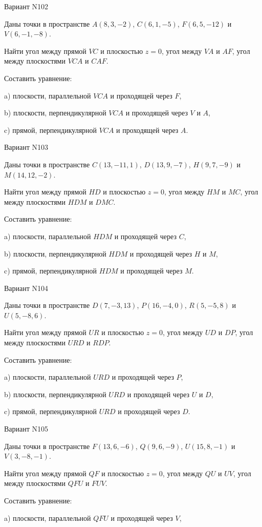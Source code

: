\documentclass[11pt]{report}
\begin{document}
Вариант N102

Даны точки в пространстве
$A(8, 3, -2)$, $C(6, 1, -5)$, $F(6, 5, -12)$ и
$V(6, -1, -8)$.

Найти угол между прямой $VC$ и плоскостью $z = 0$, угол между $VA$ и $AF$, угол между плоскостями $VCA$ 
и $CAF$.

Составить уравнение: 

a) плоскости, параллельной $VCA$ и проходящей через $F$,

b) плоскости, перпендикулярной $VCA$ и проходящей через $V$ и $A$,

c) прямой, перпендикулярной $VCA$ и проходящей через $A$.

Вариант N103

Даны точки в пространстве
$C(13, -11, 1)$, $D(13, 9, -7)$, $H(9, 7, -9)$ и
$M(14, 12, -2)$.

Найти угол между прямой $HD$ и плоскостью $z = 0$, угол между $HM$ и $MC$, угол между плоскостями $HDM$ 
и $DMC$.

Составить уравнение: 

a) плоскости, параллельной $HDM$ и проходящей через $C$,

b) плоскости, перпендикулярной $HDM$ и проходящей через $H$ и $M$,

c) прямой, перпендикулярной $HDM$ и проходящей через $M$.

Вариант N104

Даны точки в пространстве
$D(7, -3, 13)$, $P(16, -4, 0)$, $R(5, -5, 8)$ и
$U(5, -8, 6)$.

Найти угол между прямой $UR$ и плоскостью $z = 0$, угол между $UD$ и $DP$, угол между плоскостями $URD$ 
и $RDP$.

Составить уравнение: 

a) плоскости, параллельной $URD$ и проходящей через $P$,

b) плоскости, перпендикулярной $URD$ и проходящей через $U$ и $D$,

c) прямой, перпендикулярной $URD$ и проходящей через $D$.

Вариант N105

Даны точки в пространстве
$F(13, 6, -6)$, $Q(9, 6, -9)$, $U(15, 8, -1)$ и
$V(3, -8, -1)$.

Найти угол между прямой $QF$ и плоскостью $z = 0$, угол между $QU$ и $UV$, угол между плоскостями $QFU$ 
и $FUV$.

Составить уравнение: 

a) плоскости, параллельной $QFU$ и проходящей через $V$,
\end{document}

